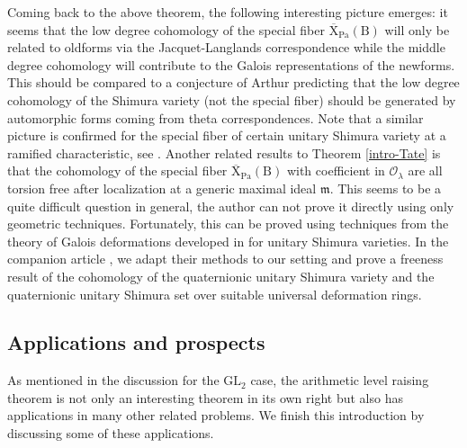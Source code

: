 \documentclass[10pt]{amsart}
\numberwithin{equation}{section}
\theoremstyle{definition}
\def\GL{\mathrm{GL}}
\def\Pa{\mathrm{Pa}}
\def\calO{\mathcal{O}}
\def\fracm{\mathfrak{m}}
\def\rmB{\mathrm{B}}
\def\rmX{\mathrm{X}}
\begin{document}
Coming back to the above theorem, the following interesting picture emerges: it seems that the low degree cohomology of the special fiber $\overline{\rmX}_{\Pa}(\rmB)$ will only be related to oldforms via the Jacquet-Langlands correspondence while the middle degree cohomology will contribute to the Galois representations of the newforms. This should be compared to a conjecture of Arthur predicting that the low degree cohomology of the Shimura variety (not the special fiber) should be generated by automorphic forms coming from theta correspondences.  Note that a similar picture is confirmed for the special fiber of certain unitary Shimura variety at a ramified characteristic, see \cite[Proposition 6.3.1]{LTXZZ}. Another related results to Theorem \ref{intro-Tate} is that the cohomology of the special fiber $\overline{\rmX}_{\Pa}(\rmB)$  with coefficient in $\calO_{\lambda}$ are all torsion free after localization at a generic maximal ideal $\fracm$. This seems to be a quite difficult question in general, the author can not prove it directly using only geometric techniques. Fortunately, this can be proved using techniques from the theory of Galois deformations developed in \cite{LTXZZa} for unitary Shimura varieties.  In the companion article \cite{Wangd}, we adapt their methods to our setting and prove a freeness result of the cohomology of the quaternionic unitary Shimura variety and the quaternionic unitary Shimura set over suitable universal deformation rings. 

\subsection{Applications and prospects} As mentioned in the discussion for the $\GL_{2}$ case, the arithmetic level raising theorem is not only an interesting theorem in its own right but also has applications in many other related problems. We finish this introduction by discussing some of these applications. 
\end{document}
